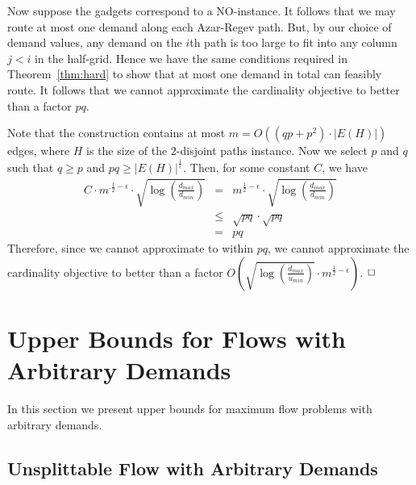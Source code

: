\documentclass[12pt]{article}
\newcommand{\qed}{$\hfill{\Box}$}
\begin{document}
Now suppose the gadgets correspond to a NO-instance. It follows that we may route at most one demand along each Azar-Regev path.
But, by our choice of demand values, any demand on the $i$th path is too large to fit into any column $j < i$ in the half-grid.
Hence we have the same conditions required in Theorem~\ref{thm:hard} to show that at most one demand in total can feasibly route.
It follows that we cannot approximate the cardinality objective to better than a factor $pq$.

Note that the construction contains at most $m=O((qp+ p^2)\cdot |E(H)|)$ edges, where $H$ is the size of the $2$-disjoint paths instance.
Now we select $p$ and $q$ such that $q\ge p$ and $pq\ge |E(H)|^{\frac{1}{\epsilon}}$.
Then, for some constant $C$, we have
\begin{eqnarray*}
C\cdot m^{.\frac12-\epsilon}\cdot \sqrt{\log(\frac{d_{max}}{d_{min}})} &=& m^{\frac12-\epsilon} \cdot \sqrt{\log(\frac{d_{max}}{d_{min}})} \\
&\le & \sqrt{pq}\cdot \sqrt{pq}\\
&=& pq
\end{eqnarray*}
Therefore, since we cannot approximate to within $pq$, we cannot
approximate the cardinality objective to better than a factor $O(\sqrt{\log (\frac{d_{max}}{u_{min}})}\cdot m^{\frac12-\epsilon})$. \qed





























\section{Upper Bounds for Flows with Arbitrary Demands}\label{sec:upper}

In this section we present upper bounds for maximum flow problems with arbitrary demands.

\subsection{Unsplittable Flow with Arbitrary Demands}\label{sec:upper-unsplittable}
\end{document}
